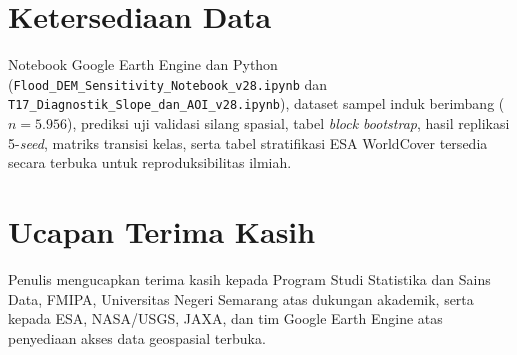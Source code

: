 \documentclass[11pt,twoside]{article}
\newcommand{\acknowledg}[1]{
\section*{Ucapan Terima Kasih}
#1
}
\begin{document}
\section*{Ketersediaan Data}
Notebook Google Earth Engine dan Python (\texttt{Flood\_DEM\_Sensitivity\_Notebook\_v28.ipynb} dan \texttt{T17\_Diagnostik\_Slope\_dan\_AOI\_v28.ipynb}), dataset sampel induk berimbang ($n = 5.956$), prediksi uji validasi silang spasial, tabel \textit{block bootstrap}, hasil replikasi 5-\textit{seed}, matriks transisi kelas, serta tabel stratifikasi ESA WorldCover tersedia secara terbuka untuk reproduksibilitas ilmiah.

\acknowledg{Penulis mengucapkan terima kasih kepada Program Studi Statistika dan Sains Data, FMIPA, Universitas Negeri Semarang atas dukungan akademik, serta kepada ESA, NASA/USGS, JAXA, dan tim Google Earth Engine atas penyediaan akses data geospasial terbuka.}

\FloatBarrier
\printbibliography[title={Daftar Pustaka}]
\end{document}
